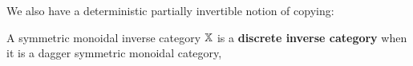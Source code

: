 We also have a deterministic partially invertible notion of copying:
\begin{definition}
A symmetric monoidal inverse category $\mathbb{X}$ is a {\bf discrete inverse category} when it is a dagger symmetric monoidal  category, 

\end{definition}
